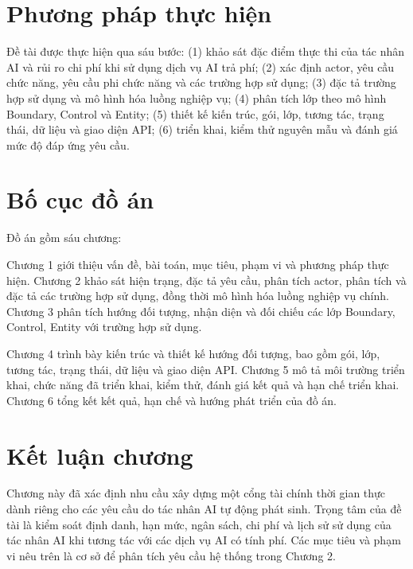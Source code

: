 \section{Phương pháp thực hiện}

Đề tài được thực hiện qua sáu bước: (1) khảo sát đặc điểm thực thi của tác nhân AI và rủi ro chi phí khi sử dụng dịch vụ AI trả phí; (2) xác định actor, yêu cầu chức năng, yêu cầu phi chức năng và các trường hợp sử dụng; (3) đặc tả trường hợp sử dụng và mô hình hóa luồng nghiệp vụ; (4) phân tích lớp theo mô hình Boundary, Control và Entity; (5) thiết kế kiến trúc, gói, lớp, tương tác, trạng thái, dữ liệu và giao diện API; (6) triển khai, kiểm thử nguyên mẫu và đánh giá mức độ đáp ứng yêu cầu.

\section{Bố cục đồ án}

Đồ án gồm sáu chương:

Chương 1 giới thiệu vấn đề, bài toán, mục tiêu, phạm vi và phương pháp thực hiện. Chương 2 khảo sát hiện trạng, đặc tả yêu cầu, phân tích actor, phân tích và đặc tả các trường hợp sử dụng, đồng thời mô hình hóa luồng nghiệp vụ chính. Chương 3 phân tích hướng đối tượng, nhận diện và đối chiếu các lớp Boundary, Control, Entity với trường hợp sử dụng.

Chương 4 trình bày kiến trúc và thiết kế hướng đối tượng, bao gồm gói, lớp, tương tác, trạng thái, dữ liệu và giao diện API. Chương 5 mô tả môi trường triển khai, chức năng đã triển khai, kiểm thử, đánh giá kết quả và hạn chế triển khai. Chương 6 tổng kết kết quả, hạn chế và hướng phát triển của đồ án.

\section*{Kết luận chương}

Chương này đã xác định nhu cầu xây dựng một cổng tài chính thời gian thực dành riêng cho các yêu cầu do tác nhân AI tự động phát sinh. Trọng tâm của đề tài là kiểm soát định danh, hạn mức, ngân sách, chi phí và lịch sử sử dụng của tác nhân AI khi tương tác với các dịch vụ AI có tính phí. Các mục tiêu và phạm vi nêu trên là cơ sở để phân tích yêu cầu hệ thống trong Chương 2.
